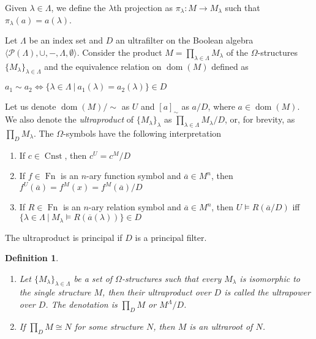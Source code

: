 \documentclass[a4paper]{article}
\theoremstyle{defin}
\newtheorem{defin}{Definition}
\theoremstyle{theorem}
\theoremstyle{prop}
\theoremstyle{lemma}
\theoremstyle{ex}
\theoremstyle{col}
\begin{document}
Given $\lambda \in \Lambda$, we define the $\lambda$th projection as $\pi_{\lambda} : M \to M_{\lambda}$ such that $\pi_{\lambda}(a) = a(\lambda)$.

Let $\Lambda$ be an index set and $D$ an ultrafilter on the Boolean algebra $\langle \mathcal{P}(\Lambda), \cup, -, \Lambda, \emptyset \rangle$. Consider the product $M = \prod \limits_{\lambda \in \Lambda} M_{\lambda}$ of the $\Omega$-structures $\{ M_{\lambda}\}_{\lambda \in \Lambda}$ and the equivalence relation on $\operatorname{dom}(M)$ defined as
\begin{center}
  $a_1 \sim a_2 \Leftrightarrow \{ \lambda \in \Lambda \: | \: a_1(\lambda) = a_2(\lambda)\} \in D$
\end{center}
Let us denote $\operatorname{dom}(M) / \sim$ as $U$ and $[a]_{\sim}$ as $a / D$, where $a \in \operatorname{dom}(M)$. We also denote the \emph{ultraproduct} of $\{ M_{\lambda} \}_{\lambda}$ as $\prod \limits_{\lambda \in \Lambda} M_{\lambda} / D$, or,
for brevity, as $\prod_{D} M_{\lambda}$. The $\Omega$-symbols have the following interpretation
\begin{enumerate}
  \item If $c \in \operatorname{Cnst}$, then $c^{U} = c^{M} / D$
  \item If $f \in \operatorname{Fn}$ is an $n$-ary function symbol and $\overline{a} \in M^{n}$, then $f^{U}(\overline{a}) = f^{M}(x) = f^{M}(\overline{a}) / D$
  \item If $R \in \operatorname{Fn}$ is an $n$-ary relation symbol and $\overline{a} \in M^{n}$, then $U \models R(\overline{a} / D)$ iff
  $\{ \lambda \in \Lambda \: | \: M_{\lambda} \models R(\overline{a} (\lambda))\} \in D$
\end{enumerate}
The ultraproduct is principal if $D$ is a principal filter.

\begin{defin}
$ $

  \begin{enumerate}
    \item Let $\{ M_{\lambda}\}_{\lambda \in \Lambda}$ be a set of $\Omega$-structures such that every
    $M_{\lambda}$ is isomorphic to the single structure $M$, then their ultraproduct over $D$ is called the ultrapower over $D$.
    The denotation is $\prod \limits_{D} M$ or $M^{\Lambda} / D$.
    \item If $\prod \limits_{D} M \cong N$ for some structure $N$, then $M$ is an ultraroot of $N$.
  \end{enumerate}
\end{defin}
\end{document}
